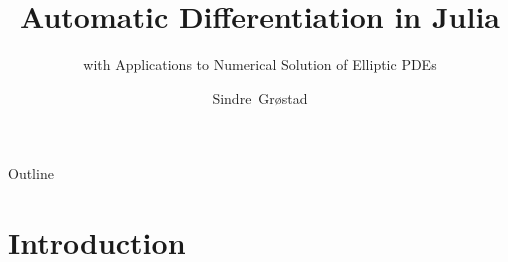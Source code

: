 \documentclass{beamer}
\title{Automatic Differentiation in Julia}
\subtitle{with Applications to Numerical Solution of Elliptic PDEs}
\author{Sindre~Grøstad}
\institute[NTNU] %
{
  TMA 4900
}
\date{}
\begin{document}
\maketitle

\begin{frame}{Outline}
  \tableofcontents
\end{frame}

\section{Introduction}








%

%
\end{document}
